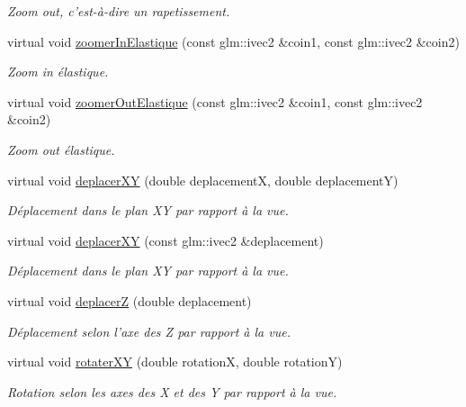 \begin{DoxyCompactItemize}
\begin{DoxyCompactList}\small\item\em Zoom out, c'est-\/à-\/dire un rapetissement. \end{DoxyCompactList}\item 
virtual void \hyperlink{classvue_1_1_vue_ortho_aa8fb0de647e8c534986348f2bd5fe4a6}{zoomer\-In\-Elastique} (const glm\-::ivec2 \&coin1, const glm\-::ivec2 \&coin2)
\begin{DoxyCompactList}\small\item\em Zoom in élastique. \end{DoxyCompactList}\item 
virtual void \hyperlink{classvue_1_1_vue_ortho_afac237d33e78faa0a8c8aa7d146f2042}{zoomer\-Out\-Elastique} (const glm\-::ivec2 \&coin1, const glm\-::ivec2 \&coin2)
\begin{DoxyCompactList}\small\item\em Zoom out élastique. \end{DoxyCompactList}\item 
virtual void \hyperlink{classvue_1_1_vue_ortho_ad66a290e3d521fcc54ca2ef8a3dacf00}{deplacer\-X\-Y} (double deplacement\-X, double deplacement\-Y)
\begin{DoxyCompactList}\small\item\em Déplacement dans le plan X\-Y par rapport à la vue. \end{DoxyCompactList}\item 
virtual void \hyperlink{classvue_1_1_vue_ortho_a82253cbbf6e6d0c93e2e06f4a5459cba}{deplacer\-X\-Y} (const glm\-::ivec2 \&deplacement)
\begin{DoxyCompactList}\small\item\em Déplacement dans le plan X\-Y par rapport à la vue. \end{DoxyCompactList}\item 
virtual void \hyperlink{classvue_1_1_vue_ortho_a3a7d25b3aa2d785e03986ace12df8b99}{deplacer\-Z} (double deplacement)
\begin{DoxyCompactList}\small\item\em Déplacement selon l'axe des Z par rapport à la vue. \end{DoxyCompactList}\item 
virtual void \hyperlink{classvue_1_1_vue_ortho_a27fc207b65998727a27ebafecee03cb9}{rotater\-X\-Y} (double rotation\-X, double rotation\-Y)
\begin{DoxyCompactList}\small\item\em Rotation selon les axes des X et des Y par rapport à la vue. \end{DoxyCompactList}\item 

\end{DoxyCompactItemize}
